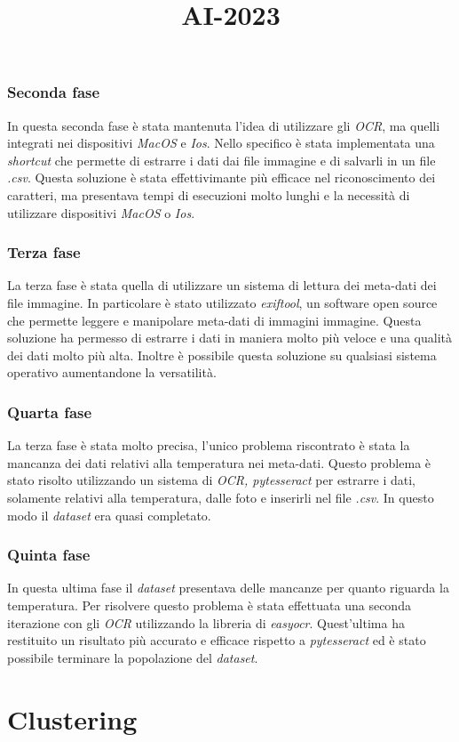 \title{AI-2023}\documentclass[12pt,a4paper,twoside]{article}
\begin{document}
\subsubsection{Seconda fase}
In questa seconda fase è stata mantenuta l'idea di utilizzare gli \textit{OCR}, ma quelli integrati nei dispositivi \textit{MacOS} e \textit{Ios}. Nello specifico è stata implementata una \textit{shortcut} che permette di estrarre i dati dai file immagine e di salvarli in un file \textit{.csv}. Questa soluzione è stata effettivimante più efficace nel riconoscimento dei caratteri, ma presentava tempi di esecuzioni molto lunghi e la necessità di utilizzare dispositivi \textit{MacOS} o \textit{Ios}.

\subsubsection{Terza fase}
La terza fase è stata quella di utilizzare un sistema di lettura dei meta-dati dei file immagine. In particolare è stato utilizzato \textit{exiftool}, un software open source che permette leggere e manipolare meta-dati di immagini immagine. Questa soluzione ha permesso di estrarre i dati in maniera molto più veloce e una qualità dei dati molto più alta. Inoltre è possibile questa soluzione su qualsiasi sistema operativo aumentandone la versatilità.
\subsubsection{Quarta fase}
La terza fase è stata molto precisa, l'unico problema riscontrato è stata la mancanza dei dati relativi alla temperatura nei meta-dati. Questo problema è stato risolto utilizzando un sistema di \textit{OCR, pytesseract} per estrarre i dati, solamente relativi alla temperatura, dalle foto e inserirli nel file \textit{.csv}. In questo modo il \textit{dataset} era quasi completato.
\subsubsection{Quinta fase}
In questa ultima fase il \textit{dataset} presentava delle mancanze per quanto riguarda la temperatura. Per risolvere questo problema è stata effettuata una seconda iterazione con gli \textit{OCR} utilizzando la libreria di \textit{easyocr}. Quest'ultima ha restituito un risultato più accurato e efficace rispetto a \textit{pytesseract} ed è stato possibile terminare la popolazione del \textit{dataset}.
\section{Clustering}
\end{document}
